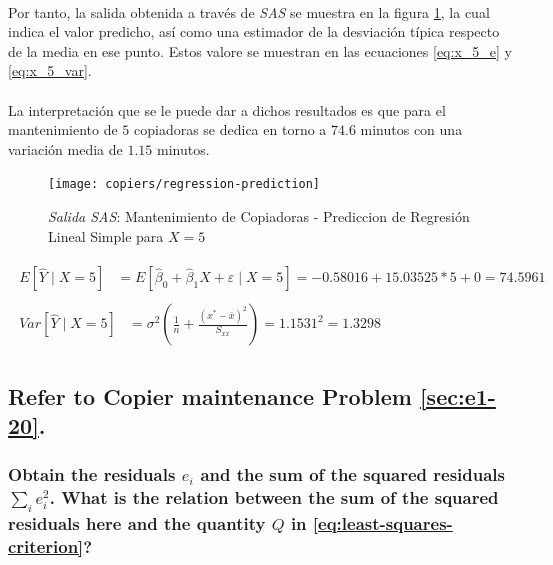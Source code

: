 \documentclass{article}
\begin{document}
        \paragraph{}
        Por tanto, la salida obtenida a través de \emph{SAS} se muestra en la figura \ref{img:copiers-regression-prediction}, la cual indica el valor predicho, así como una estimador de la desviación típica respecto de la media en ese punto. Estos valore se muestran en las ecuaciones \eqref{eq:x_5_e} y \eqref{eq:x_5_var}.

        \paragraph{}
        La interpretación que se le puede dar a dichos resultados es que para el mantenimiento de $5$ copiadoras se dedica en torno a $74.6$ minutos con una variación media de $1.15$ minutos.

        \begin{figure}[H]
          \centering
          \texttt{[image: copiers/regression-prediction]}
          \caption{\emph{Salida SAS}: Mantenimiento de Copiadoras - Prediccion de Regresión Lineal Simple para $X = 5$}
          \label{img:copiers-regression-prediction}
        \end{figure}

        \begin{align}
        \label{eq:x_5_e}
          \begin{split}
            E\left[\widehat{Y} \mid X = 5\right] &=
            E\left[\widehat{\beta}_0 +\widehat{\beta}_1X + \varepsilon \mid X = 5\right]
            = -0.58016 + 15.03525 * 5 + 0 = 74.5961
          \end{split}\\
        \label{eq:x_5_var}
          \begin{split}
            Var\left[\widehat{Y} \mid X = 5\right] &=
            \sigma^2\left(\frac{1}{n} + \frac{(x^* - \bar{x})^2}{S_{xx}}\right) =
            1.1531 ^ 2 =
            1.3298
          \end{split}
        \end{align}

    \setcounter{subsection}{23}
    \subsection{Refer to \textbf{Copier maintenance} Problem \ref{sec:e1-20}.}

      \subsubsection{Obtain the residuals $e_i$ and the sum of the squared residuals $\sum_i e_i^2$. What is the relation between the sum of the squared residuals here and the quantity $Q$ in \eqref{eq:least-squares-criterion}?}
\end{document}
